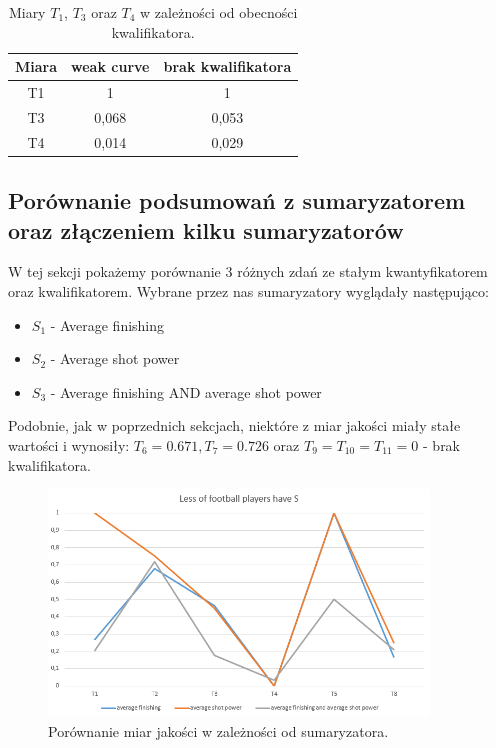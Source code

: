 \documentclass{classrep}
\begin{document}
	\begin{table}[h!]
		\centering
		\begin{tabular} {c c c}
			\hline
			\textbf{Miara} & \textbf{weak curve} & \textbf{brak kwalifikatora} \\ [0.5ex] 
			\hline	
			\hline 
			T1	& 1 &	1 \\
			T3	& 0,068 &	0,053\\
			T4	& 0,014 &	0,029 \\			
			\hline			
		\end{tabular}
		\caption{Miary $T_1$, $T_3$ oraz $T_4$ w zależności od obecności kwalifikatora. }
		\label{tabelaex2b}
	\end{table}

	\newpage
	\subsection{Porównanie podsumowań z sumaryzatorem oraz złączeniem kilku sumaryzatorów}
	W tej sekcji pokażemy porównanie 3 różnych zdań ze stałym kwantyfikatorem oraz kwalifikatorem. 
	Wybrane przez nas sumaryzatory wyglądały następująco:
	\begin{itemize}
		\item $S_1$ - Average finishing
		\item $S_2$ - Average shot power
		\item $S_3$ - Average finishing AND average shot power
	\end{itemize}

	Podobnie, jak w poprzednich sekcjach, niektóre z miar jakości miały stałe wartości i wynosiły: $ T_6 = 0.671, T_7 = 0.726$  oraz $T_9 = T_{10} = T_{11} = 0$ - brak kwalifikatora.

	\begin{figure}[h!]
		\centering
		\includegraphics[width=0.9\textwidth]{ex/3a.png}
		\caption{Porównanie miar jakości w zależności od sumaryzatora.}
		\label{wykresex3a}
	\end{figure}
	
\end{document}
